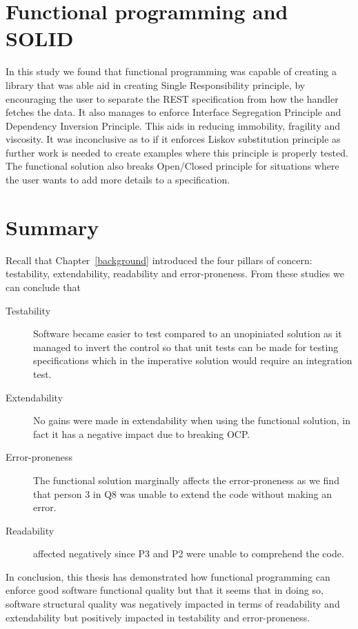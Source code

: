 \section{Functional programming and SOLID}

In this study we found that functional programming was capable of creating a
library that was able aid in creating Single Responsibility principle, by
encouraging the user to separate the REST specification from how the handler
fetches the data. It also manages to enforce Interface Segregation Principle and
Dependency Inversion Principle. This aids in reducing immobility, fragility and
viscosity. It was inconclusive as to if it enforces Liskov substitution
principle as further work is needed to create examples where this principle is
properly tested. The functional solution also breaks Open/Closed principle for
situations where the user wants to add more details to a specification.

\section{Summary}

Recall that Chapter~\ref{background} introduced the four pillars of concern:
testability, extendability, readability and error-proneness. From these studies
we can conclude that

\begin{description}
    \item[Testability] Software became easier to test compared to an unopiniated
        solution as it managed to invert the control so that unit tests can be
        made for testing specifications which in the imperative solution would
        require an integration test.
	\item[Extendability] No gains were made in extendability when using the 
	functional solution, in fact it has a negative impact due to breaking OCP.
    \item[Error-proneness] The functional solution marginally affects the
        error-proneness as we find that person 3 in Q8 was unable to extend the
        code without making an error.
    \item[Readability] affected negatively since P3 and P2 were unable to
        comprehend the code.
\end{description}

In conclusion, this thesis has demonstrated how functional programming can
enforce good software functional quality but that it seems that in doing so,
software structural quality was negatively impacted in terms of readability and
extendability but positively impacted in testability and error-proneness. 

